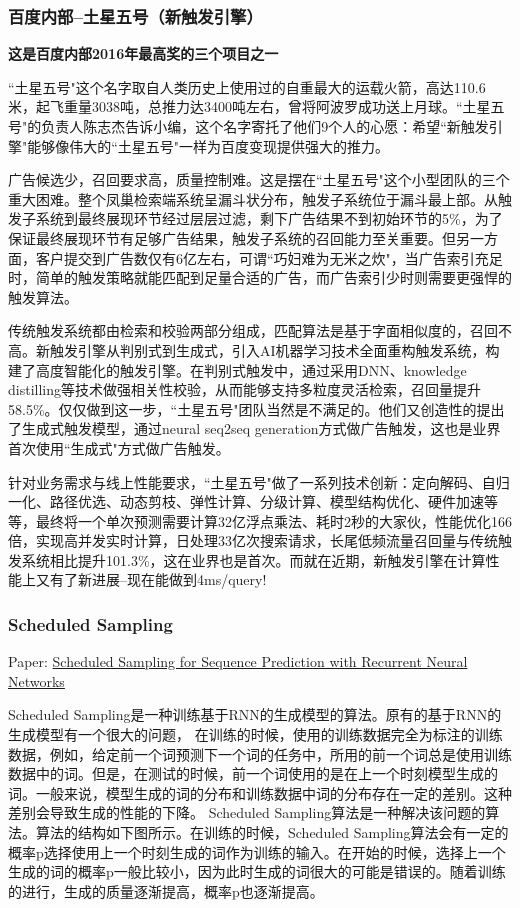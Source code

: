 \documentclass[10pt,a4paper]{ctexbook}
\begin{document}
\subsubsection{百度内部--土星五号（新触发引擎）}
\textbf{这是百度内部2016年最高奖的三个项目之一}

``土星五号"这个名字取自人类历史上使用过的自重最大的运载火箭，高达110.6米，起飞重量3038吨，总推力达3400吨左右，曾将阿波罗成功送上月球。``土星五号"的负责人陈志杰告诉小编，这个名字寄托了他们9个人的心愿：希望``新触发引擎"能够像伟大的``土星五号"一样为百度变现提供强大的推力。

广告候选少，召回要求高，质量控制难。这是摆在``土星五号"这个小型团队的三个重大困难。整个凤巢检索端系统呈漏斗状分布，触发子系统位于漏斗最上部。从触发子系统到最终展现环节经过层层过滤，剩下广告结果不到初始环节的5\%，为了保证最终展现环节有足够广告结果，触发子系统的召回能力至关重要。但另一方面，客户提交到广告数仅有6亿左右，可谓``巧妇难为无米之炊"，当广告索引充足时，简单的触发策略就能匹配到足量合适的广告，而广告索引少时则需要更强悍的触发算法。

传统触发系统都由检索和校验两部分组成，匹配算法是基于字面相似度的，召回不高。新触发引擎从判别式到生成式，引入AI机器学习技术全面重构触发系统，构建了高度智能化的触发引擎。在判别式触发中，通过采用DNN、knowledge distilling等技术做强相关性校验，从而能够支持多粒度灵活检索，召回量提升58.5\%。仅仅做到这一步，``土星五号"团队当然是不满足的。他们又创造性的提出了生成式触发模型，通过neural seq2seq generation方式做广告触发，这也是业界首次使用``生成式"方式做广告触发。 

针对业务需求与线上性能要求，``土星五号"做了一系列技术创新：定向解码、自归一化、路径优选、动态剪枝、弹性计算、分级计算、模型结构优化、硬件加速等等，最终将一个单次预测需要计算32亿浮点乘法、耗时2秒的大家伙，性能优化166倍，实现高并发实时计算，日处理33亿次搜索请求，长尾低频流量召回量与传统触发系统相比提升101.3\%，这在业界也是首次。而就在近期，新触发引擎在计算性能上又有了新进展--现在能做到4ms/query!


\subsubsection{Scheduled Sampling}
Paper: \href{https://arxiv.org/pdf/1506.03099.pdf}{Scheduled Sampling for Sequence Prediction with Recurrent Neural Networks}

Scheduled Sampling是一种训练基于RNN的生成模型的算法。原有的基于RNN的生成模型有一个很大的问题， 在训练的时候，使用的训练数据完全为标注的训练数据，例如，给定前一个词预测下一个词的任务中，所用的前一个词总是使用训练数据中的词。但是，在测试的时候，前一个词使用的是在上一个时刻模型生成的词。一般来说，模型生成的词的分布和训练数据中词的分布存在一定的差别。这种差别会导致生成的性能的下降。
Scheduled Sampling算法是一种解决该问题的算法。算法的结构如下图所示。在训练的时候，Scheduled Sampling算法会有一定的概率p选择使用上一个时刻生成的词作为训练的输入。在开始的时候，选择上一个生成的词的概率p一般比较小，因为此时生成的词很大的可能是错误的。随着训练的进行，生成的质量逐渐提高，概率p也逐渐提高。
\end{document}
